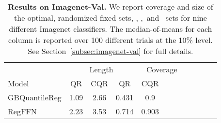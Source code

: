 \begin{table}[t] 
\centering 
\small 
\begin{tabular}{lccccccccccc} 
\toprule 
 & \multicolumn{3}{c}{Length}  & \multicolumn{4}{c}{Coverage}  \\ 
\cmidrule(r){2-3}  \cmidrule(r){4-5} 
Model & QR & CQR & QR & CQR \\ 
\midrule 
 GBQuantileReg & 1.09 & 2.66 & 0.431 & 0.9 \\ 
 RegFFN & 2.23 & 3.53 & 0.714 & 0.903 \\ 
\bottomrule 
\end{tabular} 
\caption{\textbf{Results on Imagenet-Val.} We report coverage and size of the optimal, randomized fixed sets, \naive, \aps,\ and \raps\ sets for nine different Imagenet classifiers. The median-of-means for each column is reported over 100 different trials at the 10\% level. See Section~\ref{subsec:imagenet-val} for full details.} 
\label{table:imagenet-val} 
\end{table} 
